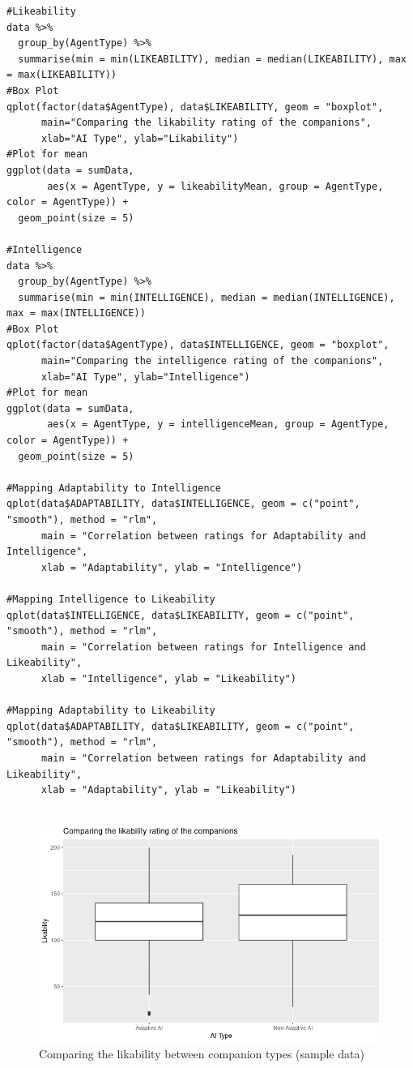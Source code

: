 \documentclass{IEEEtran}
\begin{document}
\begin{verbatim}
#Likeability
data %>%
  group_by(AgentType) %>%
  summarise(min = min(LIKEABILITY), median = median(LIKEABILITY), max = max(LIKEABILITY))
#Box Plot
qplot(factor(data$AgentType), data$LIKEABILITY, geom = "boxplot", 
      main="Comparing the likability rating of the companions", 
      xlab="AI Type", ylab="Likability")
#Plot for mean
ggplot(data = sumData,
       aes(x = AgentType, y = likeabilityMean, group = AgentType, color = AgentType)) +
  geom_point(size = 5)

#Intelligence
data %>%
  group_by(AgentType) %>%
  summarise(min = min(INTELLIGENCE), median = median(INTELLIGENCE), max = max(INTELLIGENCE))
#Box Plot
qplot(factor(data$AgentType), data$INTELLIGENCE, geom = "boxplot", 
      main="Comparing the intelligence rating of the companions", 
      xlab="AI Type", ylab="Intelligence")
#Plot for mean
ggplot(data = sumData,
       aes(x = AgentType, y = intelligenceMean, group = AgentType, color = AgentType)) +
  geom_point(size = 5)

#Mapping Adaptability to Intelligence
qplot(data$ADAPTABILITY, data$INTELLIGENCE, geom = c("point", "smooth"), method = "rlm",
      main = "Correlation between ratings for Adaptability and Intelligence", 
      xlab = "Adaptability", ylab = "Intelligence")

#Mapping Intelligence to Likeability
qplot(data$INTELLIGENCE, data$LIKEABILITY, geom = c("point", "smooth"), method = "rlm",
      main = "Correlation between ratings for Intelligence and Likeability", 
      xlab = "Intelligence", ylab = "Likeability")

#Mapping Adaptability to Likeability
qplot(data$ADAPTABILITY, data$LIKEABILITY, geom = c("point", "smooth"), method = "rlm",
      main = "Correlation between ratings for Adaptability and Likeability", 
      xlab = "Adaptability", ylab = "Likeability")


\end{verbatim}

\begin{figure}
  \centering
  \includegraphics[width=\linewidth]{Images/Graphs/LikabilityRplot.png}
  
\caption{Comparing the likability between companion types (sample data)}
\label{fig:LikabilityRplot}
\end{figure}
\end{document}
